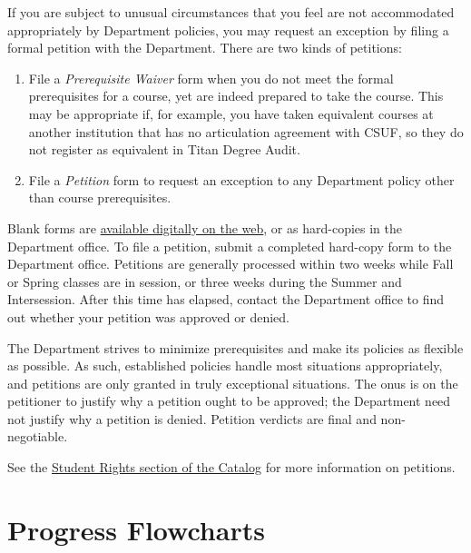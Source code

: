 \documentclass{book}
\newcommand{\campusname}{CSUF}
\begin{document}
If you are subject to unusual circumstances that you feel are not accommodated appropriately by Department policies, you may request an exception by filing a formal petition with the Department. There are two kinds of petitions:
\begin{enumerate}
\item File a \emph{Prerequisite Waiver} form when you do not meet the formal prerequisites for a course, yet are indeed prepared to take the course. This may be appropriate if, for example, you have taken equivalent courses at another institution that has no articulation agreement with \campusname, so they do not register as equivalent in Titan Degree Audit.
\item File a \emph{Petition} form to request an exception to any Department policy other than course prerequisites.
\end{enumerate}

Blank forms are \href{http://fullerton.edu/ecs/cs/resources/formsDocuments.asp}{available digitally on the web}, or as hard-copies in the Department office. To file a petition, submit a completed hard-copy form to the Department office. Petitions are generally processed within two weeks while Fall or Spring classes are in session, or three weeks during the Summer and Intersession. After this time has elapsed, contact the Department office to find out whether your petition was approved or denied.

The Department strives to minimize prerequisites and make its policies as flexible as possible. As such, established policies handle most situations appropriately, and petitions are only granted in truly exceptional situations. The onus is on the petitioner to justify why a petition ought to be approved; the Department need not justify why a petition is denied. Petition verdicts are final and non-negotiable.

See the \href{http://catalog.fullerton.edu/content.php?catoid=2&navoid=115#Student_Rights}{Student Rights section of the Catalog} for more information on petitions.

\chapter{Progress Flowcharts}
\end{document}
